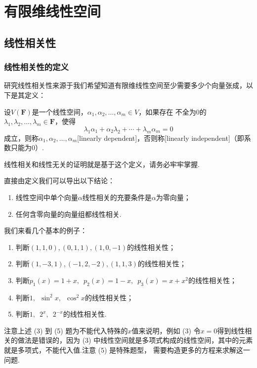 \chapter{有限维线性空间}

\section{线性相关性}
\subsection{线性相关性的定义}
研究线性相关性来源于我们希望知道有限维线性空间至少需要多少个向量张成，以下是其定义：
\begin{definition}
    设$V(\mathbf{F})$是一个线性空间，$\alpha_1,\alpha_2,\ldots,\alpha_m\in V$，如果存在
    不全为0的$\lambda_1,\lambda_2,\ldots,\lambda_m\in\mathbf{F}$，使得
    \[\lambda_1\alpha_1+\alpha_2\lambda_2+\cdots+\lambda_m\alpha_m=0\]
    成立，则称$\alpha_1,\alpha_2,\ldots,\alpha_m$[linearly dependent]，否则称[linearly independent]（即系数只能为0）.
\end{definition}
线性相关和线性无关的证明就是基于这个定义，请务必牢牢掌握.

直接由定义我们可以导出以下结论：
\begin{enumerate}
    \item 线性空间中单个向量$\alpha$线性相关的充要条件是$\alpha$为零向量；

    \item 任何含零向量的向量组都线性相关.
\end{enumerate}

我们来看几个基本的例子：
\begin{example}
    \begin{enumerate}[label=(\arabic*)]
        \item 判断$(1,1,0),(0,1,1),(1,0,-1)$的线性相关性；

        \item 判断$(1,-3,1),(-1,2,-2),(1,1,3)$的线性相关性；

        \item 判断$p_1(x)=1+x,\enspace p_2(x)=1-x,\enspace p_3(x)=x+x^2$的线性相关性；

        \item 判断$1,\enspace \sin^2x,\enspace \cos^2x$的线性相关性；

        \item 判断$1,\enspace 2^x,\enspace 2^{-x}$的线性相关性.
    \end{enumerate}
\end{example}
注意上述 (3) 到 (5) 题为不能代入特殊的$x$值来说明，例如 (3) 令$x=0$得到线性相关的做法是错误的，因为
(3) 中线性空间就是多项式构成的线性空间，其中的元素就是多项式，不能代入值.注意 (5) 是特殊题型，
需要构造更多的方程来求解这一问题.


